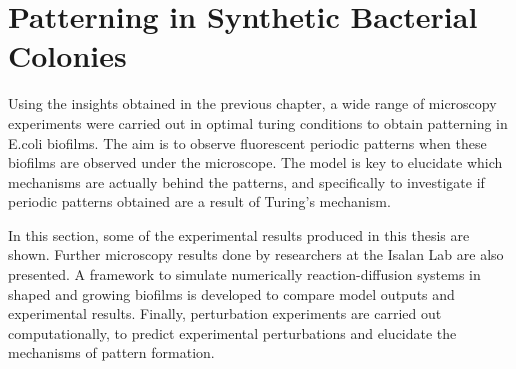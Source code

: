 \chapter{Patterning in Synthetic Bacterial Colonies} \label{chapter3}
%

Using the insights obtained in the previous chapter, a wide range of microscopy experiments were carried out in optimal turing conditions to obtain patterning in E.coli biofilms.
The aim is to observe fluorescent periodic patterns when these biofilms are observed under the microscope.
The model is key to elucidate which mechanisms are actually behind the patterns, and specifically to investigate if periodic patterns obtained are a result of Turing's mechanism.

In this section, some of the experimental results produced in this thesis are shown.
Further microscopy results done by researchers at the Isalan Lab are also presented.
A framework to simulate numerically reaction-diffusion systems in shaped and growing biofilms is developed to compare model outputs and experimental results.
Finally, perturbation experiments are carried out computationally, to predict experimental perturbations and elucidate the mechanisms of pattern formation.


%


